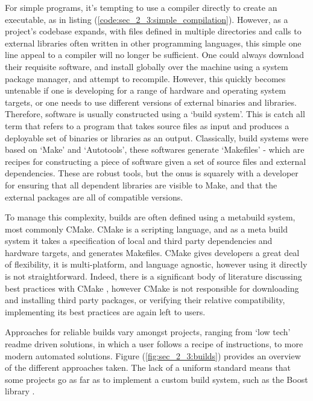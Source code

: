 For simple programs, it's tempting to use a compiler directly to create an executable, as in listing (\ref{code:sec_2_3:simple_compilation}). However, as a project's codebase expands, with files defined in multiple directories and calls to external libraries often written in other programming languages, this simple one line appeal to a compiler will no longer be sufficient. One could always download their requisite software, and install globally over the machine using a system package manager, and attempt to recompile. However, this quickly becomes untenable if one is developing for a range of hardware and operating system targets, or one needs to use different versions of external binaries and libraries. Therefore, software is usually constructed using a `build system'. This is catch all term that refers to a program that takes source files as input and produces a deployable set of binaries or libraries as an output. Classically, build systems were based on `Make' and `Autotools', these softwares generate `Makefiles' - which are recipes for constructing a piece of software given a set of source files and external dependencies. These are robust tools, but the onus is squarely with a developer for ensuring that all dependent libraries are visible to Make, and that the external packages are all of compatible versions.

To manage this complexity, builds are often defined using a metabuild system, most commonly CMake. CMake is a scripting language, and as a meta build system it takes a specification of local and third party dependencies and hardware targets, and generates Makefiles. CMake gives developers a great deal of flexibility, it is multi-platform, and language agnostic, however using it directly is not straightforward. Indeed, there is a significant body of literature discussing best practices with CMake \cite{scott2018professional}, however CMake is not responsible for downloading and installing third party packages, or verifying their relative compatibility, implementing its best practices are again left to users.

Approaches for reliable builds vary amongst projects, ranging from `low tech' readme driven solutions, in which a user follows a recipe of instructions, to more modern automated solutions. Figure (\ref{fig:sec_2_3:builds}) provides an overview of the different approaches taken. The lack of a uniform standard means that some projects go as far as to implement a custom build system, such as the Boost library \cite{boostbuild2022github}.

